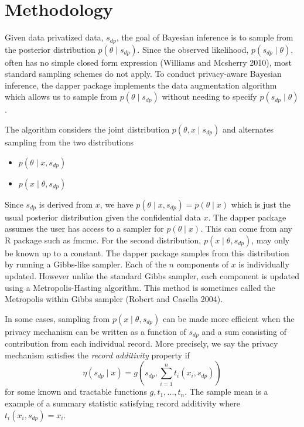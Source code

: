 \hypertarget{methodology}{%
\section{Methodology}\label{methodology}}

Given data privatized data, \(s_{dp}\), the goal of Bayesian inference is to sample from the
posterior distribution \(p(\theta \mid s_{dp})\). Since the observed likelihood,
\(p(s_{dp} \mid \theta)\), often has no simple closed form expression (Williams and Mcsherry 2010), most standard
sampling schemes do not apply. To conduct privacy-aware Bayesian inference, the dapper package implements
the data augmentation algorithm which allows us to sample from \(p(\theta \mid s_{dp})\)
without needing to specify \(p(s_{dp} \mid \theta)\).

The algorithm considers the joint distribution \(p(\theta, x \mid s_{dp})\) and
alternates sampling from the two distributions

\begin{itemize}
\tightlist
\item
  \(p(\theta \mid x, s_{dp})\)
\item
  \(p(x \mid \theta, s_{dp})\)
\end{itemize}

Since \(s_{dp}\) is derived from \(x\), we have \(p(\theta \mid x, s_{dp}) = p(\theta \mid x)\) which
is just the usual posterior distribution given the confidential data \(x\). The dapper
package assumes the user has access to a sampler for \(p(\theta \mid x)\). This can
come from any R package such as fmcmc. For the second distribution, \(p(x \mid \theta, s_{dp})\), may
only be known up to a constant. The dapper package samples from this distribution by
running a Gibbs-like sampler. Each of the \(n\) components of \(x\) is individually
updated. However unlike the standard Gibbs sampler, each component is updated
using a Metropolis-Hasting algorithm. This method is sometimes called the Metropolis within Gibbs sampler (Robert and Casella 2004).

In some cases, sampling from \(p(x \mid \theta, s_{dp})\) can be made more efficient
when the privacy mechanism can be written as a function of \(s_{dp}\) and
a sum consisting of contribution from each individual record. More precisely, we say the privacy mechanism satisfies
the \emph{record additivity} property if
\[
\eta(s_{dp} \mid x) = g(s_{dp}, \sum_{i=1}^{n}t_i(x_i, s_{dp}))
\]
for some known and tractable functions \(g, t_1, \ldots, t_n\). The sample mean is a
example of a summary statistic satisfying record additivity where \(t_i(x_i, s_{dp}) = x_i\).

